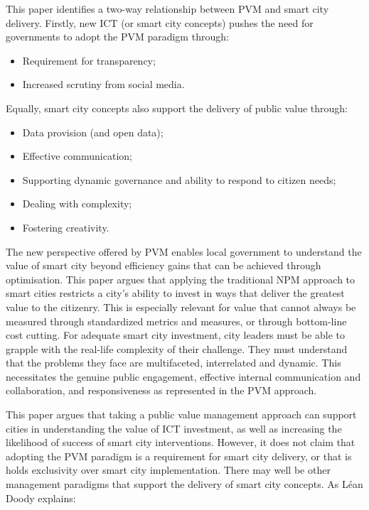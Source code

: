 \documentclass[conference]{IEEEtran}
\begin{document}
This paper identifies a two-way relationship between PVM and smart
city delivery. Firstly, new ICT (or smart city concepts) pushes the
need for governments to adopt the PVM paradigm through:

\begin{itemize}
\item Requirement for transparency;
\item Increased scrutiny from social media.
\end{itemize}

Equally, smart city concepts also support the delivery of public value through:

\begin{itemize}
\item Data provision (and open data);
\item Effective communication;
\item Supporting dynamic governance and ability to respond to citizen needs;
\item Dealing with complexity;
\item Fostering creativity.
\end{itemize}

The new perspective offered by PVM enables local government to
understand the value of smart city beyond efficiency gains that can be
achieved through optimisation. This paper argues that applying the
traditional NPM approach to smart cities restricts a city’s ability to
invest in ways that deliver the greatest value to the citizenry. This
is especially relevant for value that cannot always be measured
through standardized metrics and measures, or through bottom-line cost
cutting. For adequate smart city investment, city leaders must be able
to grapple with the real-life complexity of their challenge. They must
understand that the problems they face are multifaceted, interrelated
and dynamic. This necessitates the genuine public engagement,
effective internal communication and collaboration, and responsiveness
as represented in the PVM approach.

This paper argues that taking a public value management approach can
support cities in understanding the value of ICT investment, as well
as increasing the likelihood of success of smart city
interventions. However, it does not claim that adopting the PVM
paradigm is a requirement for smart city delivery, or that is holds
exclusivity over smart city implementation. There may well be other
management paradigms that support the delivery of smart city
concepts. As L\'{e}an Doody explains:
\end{document}
